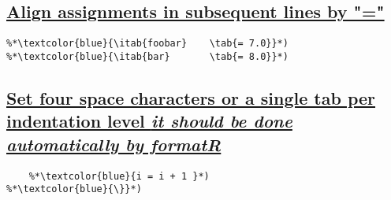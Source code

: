 \documentclass{article}
\begin{document}
\subsection{\label{align-assign}\hyperref[align-assign-ini]{Align assignments in subsequent lines by "="}}
\newcommand{\itab}[1]{\hspace{0em}\rlap{#1}}
\newcommand{\tab}[1]{\hspace{.1\textwidth}\rlap{#1}}
\begin{lstlisting}[frame=single]
%*\textcolor{blue}{\itab{foo}  \tab{= 5.0}}*)
%*\textcolor{blue}{\itab{foobar} 	\tab{= 7.0}}*)
%*\textcolor{blue}{\itab{bar} 		\tab{= 8.0}}*)
\end{lstlisting}

\subsection{\label{indentation}\hyperref[indentation-ini]{Set four space characters or a single tab per indentation level {\it it should be done automatically by formatR}}}
\begin{lstlisting}[frame=single]
%*\textcolor{blue}{while (i \textless n)\{}*)
    %*\textcolor{blue}{i = i + 1 }*)
%*\textcolor{blue}{\}}*)
\end{lstlisting}
\end{document}
